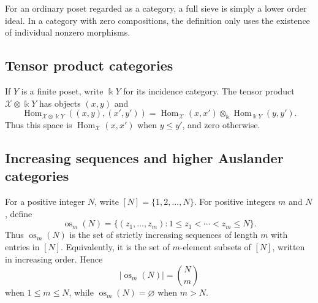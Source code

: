 \documentclass[12pt,a4paper,english,reqno]{amsart}
\theoremstyle{plain}
\theoremstyle{definition}
\newcommand{\kk}{\Bbbk}
\newcommand{\Hom}{\operatorname{Hom}}
\newcommand{\X}{\mathcal X}
\newcommand{\os}{\operatorname{os}}
\begin{document}
For an ordinary poset regarded as a category, a full sieve is simply a lower
order ideal.  In a category with zero compositions, the definition only uses
the existence of individual nonzero morphisms.

\subsection{Tensor product categories}

If $Y$ is a finite poset, write $\kk Y$ for its incidence category.
The tensor product $\X\otimes\kk Y$ has objects $(x,y)$ and
\[
 \Hom_{\X\otimes\kk Y}((x,y),(x',y'))
 =
 \Hom_{\X}(x,x')\otimes_{\kk}\Hom_{\kk Y}(y,y').
\]
Thus this space is $\Hom_{\X}(x,x')$ when $y\leq y'$, and zero otherwise.

\subsection{Increasing sequences and higher Auslander categories}

For a positive integer $N$, write $[N]=\{1,2,\ldots,N\}$.
For positive integers $m$ and $N$, define
\[
\os_m(N)
=
\{(z_1,\ldots,z_m):
1\leq z_1<\cdots<z_m\leq N\}.
\]
Thus $\os_m(N)$ is the set of strictly increasing sequences of length
$m$ with entries in $[N]$. Equivalently, it is the set of $m$-element
subsets of $[N]$, written in increasing order. Hence
\[
|\os_m(N)|=\binom{N}{m}
\]
when $1\leq m\leq N$, while $\os_m(N)=\varnothing$ when $m>N$.
\end{document}
